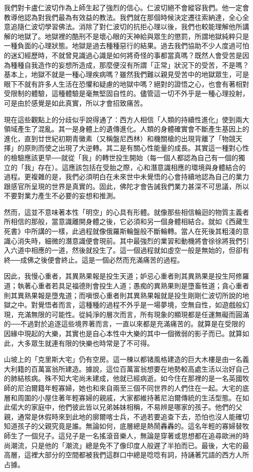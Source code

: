 我們對卡盧仁波切作為上師生起了強烈的信心。仁波切絕不會縱容我們。他一定會教導他認為對我們最為有效益的教法。我們就在那個時候決定遷往索納達，全心全意追隨仁波切學習佛法。消除了對仁波切的抗拒心理以後，我們也較能理解他所講解的地獄了。地獄裡的酷刑不是壞心眼的天神給與眾生的懲罰，所謂地獄純粹只是一種負面的心理狀態。地獄是過去種種惡行的結果。過去我們協助不少人度過可怕的迷幻經歷時，不就曾見識過心識是如何將奇怪的事都當真嗎？既然人會受苦是因為種種自我造作的妄想所造成，那麼便沒有所謂「正常」狀況下的受苦，不是嗎？基本上，地獄不就是一種心理疾病嗎？雖然我們難以親見受苦中的地獄眾生，可是眼下不就有許多人生活在恐懼和疑慮的地獄中嗎？絕對的證悟之心，也會有著相對受限制的體驗，這種體驗是毫無堅固自性的。儘管這一切不外乎是一種心理投射，可是由於感覺是如此真實，所以才會招致痛苦。

現在這些觀點上的分歧似乎說得通了：西方人相信「人類的持續性進化」使到兩大領域產生了混亂。其一是身體上的遺傳進化。人類的身體確實會不斷產生基因上的進化，直到廿世紀初期青黴素（又稱盤尼西林）和機關槍的出現背離了「物競天擇」的原則而使之出現了大逆轉。其二是有關心性能量的成長。其實這一種對心性的檢驗應該更早──就從「我」的轉世投生開始（每一個人都認為自己有一個的獨立的「我」存在）。這應該包括在受胎之際，心和潛意識相應的環境與身體結合的過程。更複雜的是，我們必須明白在未來世中未覺悟的心會持續地認為自己的業力跟感官所呈現的世界是真實的。固此，佛陀才會告誡我們業力甚深不可思議，所以不要對業力產生不必要的妄想和推測。

然而，這並不意味著本性「明空」的心具有形體。就像那些相信輪迴的物質主義者所相信的那般，當意識離開身體之後，它必須和另一個身體相結合。就如《西藏生死書》中所講的一樣，此過程就像俄羅斯輪盤般不斷輪轉。當人在死後其粗淺的意識心消失時，細微的潛意識便會現前。其中最強烈的業習和動機將會徐徐將我們引入六道中相應的一道，然後就投生了。這一個過程就如虛空一般是無始的，但卻有終──成佛之後便會終止。這是一個必然而充滿痛苦的過程。

因此，我慢心重者，其異熟果報是投生天道；妒忌心重者則其異熟果是投生阿修羅道；執著心重者若具足福德則會投生人道；愚痴的異熟果則是墮畜牲道；貪心重者則其異熟果報是墮鬼道；而嗔恨心重者則其異熟果報就是投生剛剛仁波切所說的地獄之中。對覺悟者而言，這種種的過程不外乎是一場夢境，空無自性，如遊戲般幻現，充滿無限的可能性。從純淨的層次而言，所有現象的顯現都是任運無礙而圓滿的──不過對於追逐這些境界著而言，一直以來都是充滿痛苦的。就算是在受限的因緣中現起的大樂，其實也是自心本性中大樂的其中一個微弱的影子而已。就算如此，大多眾生就連有限的快樂也時常是了不可得。

山坡上的「克里斯大宅」仍有空房。這一棟以都锗風格建造的巨大木樓是由一名義大利籍的百萬富翁所建造。據說，這位百萬富翁想要在地勢較高處生活以治好自己的肺結核病。殊不知大宅尚未建成，他就已經病逝。如今住在那裡的是一名英國牧師的尼泊爾籍年輕寡婦，她也和來自兩至三個不同世界的人們住在一起。大宅的底層和周圍的小屋住著年輕寡婦的親戚，大家都維持著尼泊爾傳統的生活型態。在如此偌大的家庭中，他們彼此皆以兄弟姊妹相稱，不易辨是哪家的孩子。他們的父親，通常是休假時來到此地的廓爾喀士兵，不過若要追查下去，恐怕也沒人能確切知道孩子的父親究竟是誰。無論如何，底層總是熱鬧轟轟的。這名年輕的寡婦替牧師生了一個兒子。這兒子是一名搖滾音樂人，無論是穿著或思想都在追尋歐洲的時尚潮流，只是他的「潮流」總是免不了像印度人般遲了半拍而已。最後，大宅的最高層，這裡大部分的空間都被我們這群口中總是唸唸有詞，持誦著咒語的西方人所占據。

